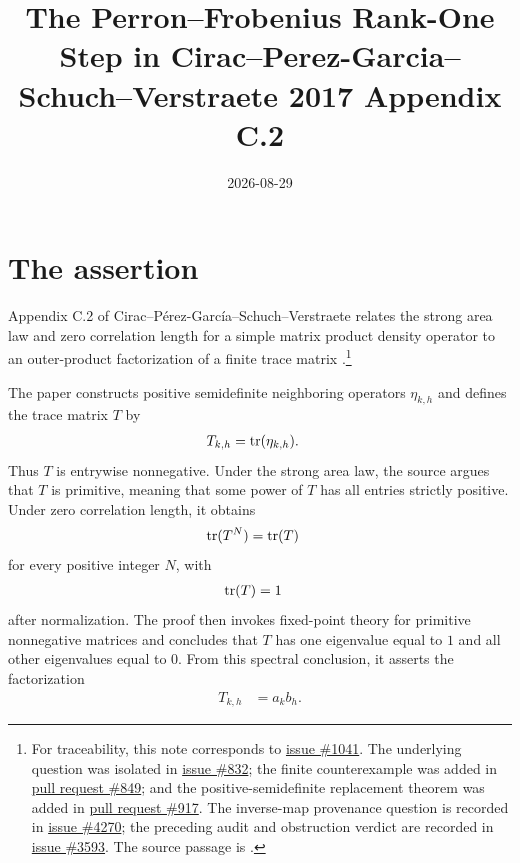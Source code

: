 \documentclass{article}
\title{The Perron--Frobenius Rank-One Step in Cirac--Perez-Garcia--Schuch--Verstraete 2017 Appendix C.2}
\author{}
\date{2026-08-29}
\begin{document}
\maketitle
{}

\section{The assertion}
\label{sec:cpgsv17_assertion}

Appendix C.2 of Cirac--P\'erez-Garc\'ia--Schuch--Verstraete relates the strong
area law and zero correlation length for a simple matrix product density
operator to an outer-product factorization of a finite trace matrix
\cite[Appendix~C.2, Lemmas~C.3--C.4]{Cirac2016MPDO_arXiv}.\footnote{For
traceability, this note corresponds to
\href{https://github.com/LionSR/TNLean/issues/1041}{issue \#1041}. The
underlying question was isolated in
\href{https://github.com/LionSR/TNLean/issues/832}{issue \#832}; the finite
counterexample was added in
\href{https://github.com/LionSR/TNLean/pull/849}{pull request \#849}; and the
positive-semidefinite replacement theorem was added in
\href{https://github.com/LionSR/TNLean/pull/917}{pull request \#917}. The
inverse-map provenance question is recorded in
\href{https://github.com/LionSR/TNLean/issues/4270}{issue \#4270}; the
preceding audit and obstruction verdict are recorded in
\href{https://github.com/LionSR/TNLean/issues/3593}{issue \#3593}. The source
passage is .}

The paper constructs positive semidefinite neighboring operators
$\eta_{k,h}$ and defines the trace matrix $T$ by
\begin{align}
    T_{k,h}
        &= \operatorname{tr}(\eta_{k,h}).
    \label{eq:cpgsv17_trace_matrix_definition}
\end{align}
Thus $T$ is entrywise nonnegative. Under the strong area law, the source argues
that $T$ is primitive, meaning that some power of $T$ has all entries strictly
positive. Under zero correlation length, it obtains
\begin{align}
    \operatorname{tr}(T^N)
        &= \operatorname{tr}(T)
    \label{eq:cpgsv17_constant_power_traces}
\end{align}
for every positive integer $N$, with
\begin{align}
    \operatorname{tr}(T)
        &= 1
    \label{eq:cpgsv17_trace_normalization}
\end{align}
after normalization. The proof then invokes fixed-point theory for primitive
nonnegative matrices and concludes that $T$ has one eigenvalue equal to $1$
and all other eigenvalues equal to $0$. From this spectral conclusion, it
asserts the factorization
\begin{align}
    T_{k,h}
        &= a_k b_h.
    \label{eq:cpgsv17_source_outer_product}
\end{align}
\end{document}
